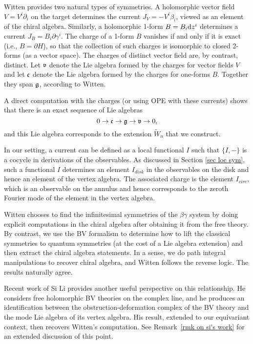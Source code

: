 Witten provides two natural types of symmetries.
A holomorphic vector field $V = V^i \partial_i$ on the target determines the current $J_V = -V^i \beta_i$,
viewed as an element of the chiral algebra.
Similarly, a holomorphic 1-form $B = B_i {\rm d} z^i$ determines a current $J_B = B_i \partial \gamma^i$.
The charge of a 1-form $B$ vanishes if and only if it is exact (i.e., $B = \partial H$),
so that the collection of such charges is isomorphic to closed 2-forms (as a vector space).
The charges of distinct vector field are, by contrast, distinct.
Let $\frak{v}$ denote the Lie algebra formed by the charges for vector fields $V$ and 
let $\frak{c}$ denote the Lie algebra formed by the charges for one-forms $B$.
Together they span $\mathfrak g$, according to Witten.

A direct computation with the charges (or using OPE with these currents) shows that there is an exact sequence of Lie algebras
\[
0 \to \frak{c} \to \mathfrak g \to \frak{v} \to 0,
\]
and this Lie algebra corresponds to the extension $\widetilde{W}_n$ that we construct.

In our setting, a current can be defined as a local functional $I$ such that $\{I,-\}$ is a cocycle in derivations of the observables.
As discussed in Section \ref{sec loc sym}, such a functional $I$ determines an element $I_{disk}$ in the observables on the disk and hence an element of the vertex algebra.
The associated charge is the element $I_{circ}$, which is an observable on the annulus and hence corresponds to the zeroth Fourier mode of the element in the vertex algebra.

Witten chooses to find the infinitesimal symmetries of the $\beta\gamma$ system 
by doing explicit computations in the chiral algebra after obtaining it from the free theory.
By contrast, we use the BV formalism to determine how to lift the classical symmetries to quantum symmetries
(at the cost of a Lie algebra extension)
and then extract the chiral algebra statements.
In a sense, we do path integral manipulations to recover chiral algebra, 
and Witten follows the reverse logic.
The results naturally agree.

\begin{rmk}
Recent work  \cite{LiQME} of Si Li provides another useful perspective on this relationship. 
He considers free holomorphic BV theories on the complex line,
and he produces an identification between the obstruction-deformation complex of the BV theory and the mode Lie algebra of its vertex algebra.
His result, extended to our equivariant context, then recovers Witten's computation. 
See Remark~\ref{rmk on si's work} for an extended discussion of this point.
\end{rmk}

